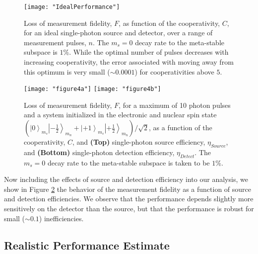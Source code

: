 \documentclass[aps,pra,amsmath,amssymb,reprint,superscriptaddress,tightenlines]{revtex4-1}
\begin{document}
\begin{figure}[b]
\texttt{[image: "IdealPerformance"]}
\caption{\label{fig:ideal_performance} Loss of measurement fidelity, $F$, as function of the cooperativity, $C$, for an ideal single-photon source and detector, over a range of measurement pulses, $n$. The $m_{s}=0$ decay rate to the meta-stable subspace is $1$\%. While the optimal number of pulses decreases with increasing cooperativity, the error associated with moving away from this optimum is very small ($\sim 0.0001$) for cooperativities above $5$.}
\end{figure}

\begin{figure}[tb]
\texttt{[image: "figure4a"]}
\texttt{[image: "figure4b"]}
\caption{\label{fig:external_parameters} Loss of measurement fidelity, $F$, for a maximum of 10 photon pulses and a system initialized in the electronic and nuclear spin state $\left( \left| 0 \right>_{m_{s}} \left| -\frac{1}{2} \right>_{m_{n}}  + \left| +1 \right>_{m_{s}} \left| +\frac{1}{2} \right>_{m_{n}} \right) / \sqrt{2}$, as a function of the cooperativity, $C$, and {\bf (Top)} single-photon source efficiency, $\eta_{Source}$, and {\bf (Bottom)} single-photon detection efficiency, $\eta_{Detect}$. The $m_{s}=0$ decay rate to the meta-stable subspace is taken to be $1$\%.}
\end{figure}

Now including the effects of source and detection efficiency into our analysis, we show in Figure \ref{fig:external_parameters} the behavior of the measurement fidelity as a function of source and detection efficiencies. We observe that the performance depends slightly more sensitively on the detector than the source, but that the performance is robust for small ($\sim 0.1$) inefficiencies.

\subsection{Realistic Performance Estimate} 
\label{sec:performance_estimate_with_commercial_parameters}
\end{document}
